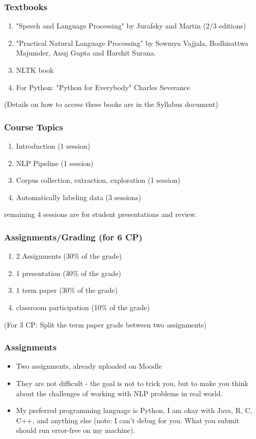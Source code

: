 \documentclass{beamer}
\begin{document}
\begin{frame}
\frametitle{Textbooks}
\begin{enumerate}
\item "Speech and Language Processing" by Jurafsky and Martin (2/3 editions)
\item "Practical Natural Language Processing" by Sowmya Vajjala, Bodhisattwa Majumder, Anuj Gupta and Harshit Surana.
\item NLTK book
\item For Python: "Python for Everybody" Charles Severance 
\end{enumerate}
(Details on how to access these books are in the Syllabus document)
\end{frame}

\begin{frame}
\frametitle{Course Topics}
\begin{enumerate}
\item Introduction (1 session)
\item NLP Pipeline (1 session)
\item Corpus collection, extraction, exploration (1 session)
\item Automatically labeling data (3 sessions)
\end{enumerate}
remaining 4 sessions are for student presentations and review.
\end{frame}

\begin{frame}
\frametitle{Assignments/Grading (for 6 CP)}
\begin{enumerate}
\item 2 Assignments (30\% of the grade)
\item 1 presentation (30\% of the grade)
\item 1 term paper (30\% of the grade)
\item classroom participation (10\% of the grade)
\end{enumerate}
(For 3 CP: Split the term paper grade between two assignments)
\end{frame}

\begin{frame}
\frametitle{Assignments}
\begin{itemize}
\item Two assignments, already uploaded on Moodle
\item They are not difficult - the goal is not to trick you, but to make you think about the challenges of working with NLP problems in real world.
\item My preferred programming language is Python, I am okay with Java, R, C, C++, and anything else (note: I can't debug for you. What you submit should run error-free on my machine). 
\end{itemize}
\end{frame}
\end{document}
